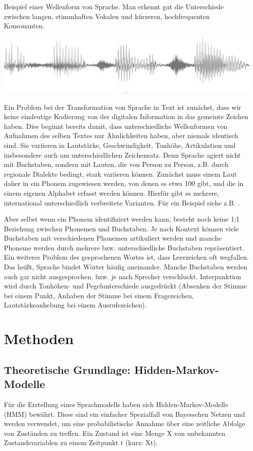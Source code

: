 Beispiel einer Wellenform von Sprache.
Man erkennt gut die Unterschiede zwischen langen, stimmhaften Vokalen und kürzeren, hochfrequenten Konsonanten.

\includegraphics{chapters/sprachverarbeitung/01.png}

Ein Problem bei der Transformation von Sprache in Text ist zunächst, dass wir keine eindeutige Kodierung von der digitalen Information in das gemeinte Zeichen haben.
Dies beginnt bereits damit, dass unterschiedliche Wellenformen von Aufnahmen des selben Textes nur Ähnlichkeiten haben, aber niemals identisch sind.
Sie variieren in Lautstärke, Geschwindigkeit, Tonhöhe, Artikulation und insbesondere auch am unterschiedlichen Zeichensatz.
Denn Sprache agiert nicht mit Buchstaben, sondern mit Lauten, die von Person zu Person, z.B.
durch regionale Dialekte bedingt, stark variieren können.
Zunächst muss einem Laut daher in ein Phonem zugewiesen werden, von denen es etwa 100 gibt, und die in einem eigenen Alphabet erfasst werden können.
Hierfür gibt es mehrere, international unterschiedlich verbreitete Varianten.
Für ein Beispiel siehe z.B. \cite[S. 1056]{russelnorvig}.

Aber selbst wenn ein Phonem identifiziert werden kann, besteht noch keine 1:1 Beziehung zwischen Phonemen und Buchstaben.
Je nach Kontext können viele Buchstaben mit verschiedenen Phonemen artikuliert werden und manche Phoneme werden durch mehrere bzw.
unterschiedliche Buchstaben repräsentiert.
Ein weiteres Problem des gesprochenen Wortes ist, dass Leerzeichen oft wegfallen.
Das heißt, Sprache bindet Wörter häufig aneinander.
Manche Buchstaben werden auch gar nicht ausgesprochen, bzw.
je nach Sprecher verschluckt.
Interpunktion wird durch Tonhöhen- und Pegelunterschiede ausgedrückt (Absenken der Stimme bei einem Punkt, Anhaben der Stimme bei einem Fragezeichen, Lautstärkeanhebung bei einem Ausrufezeichen).

\section{Methoden}
\subsection{Theoretische Grundlage: Hidden-Markov-Modelle}
Für die Erstellung eines Sprachmodells haben sich Hidden-Markov-Modelle (HMM) bewährt.
Diese sind ein einfacher Spezialfall von Bayesschen Netzen und werden verwendet, um eine probabilistische Annahme über eine zeitliche Abfolge von Zuständen zu treffen.
Ein Zustand ist eine Menge X von unbekannten Zustandsvariablen zu einem Zeitpunkt t (kurz: Xt).

